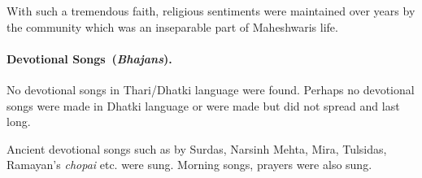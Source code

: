 With such a tremendous faith, religious sentiments were maintained over years
by the community which was an inseparable part of Maheshwaris life.

\paragraph{Devotional Songs~(\textit{Bhajans}).}
No devotional songs in Thari/Dhatki language were found. Perhaps no devotional
songs were made in Dhatki language or were made but did not spread and last
long.

Ancient devotional songs such as by Surdas, Narsinh Mehta, Mira, Tulsidas,
Ramayan's \textit{chopai} etc. were sung. Morning songs, prayers were also
sung.

